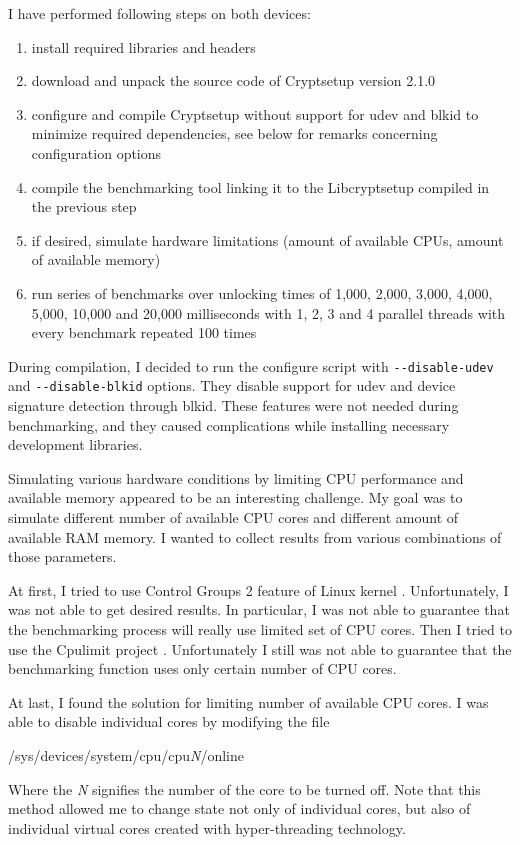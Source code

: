 \documentclass[nolof]{fithesis3}
\begin{document}
I have performed following steps on both devices:

\begin{enumerate}
\item install required libraries and headers

\item download and unpack the source code of Cryptsetup version 2.1.0

\item configure and compile Cryptsetup without support for udev and blkid to minimize required dependencies, see below for remarks concerning configuration options

\item compile the benchmarking tool linking it to the Libcryptsetup compiled in the previous step

\item if desired, simulate hardware limitations (amount of available CPUs, amount of available memory)

\item run series of benchmarks over unlocking times of 1,000, 2,000, 3,000, 4,000, 5,000, 10,000 and 20,000 milliseconds with 1, 2, 3 and 4 parallel threads with every benchmark repeated 100 times
\end{enumerate}

During compilation, I decided to run the configure script with \verb+--disable-udev+ and \verb+--disable-blkid+ options. They disable support for udev and device signature detection through blkid. These features were not needed during benchmarking, and they caused complications while installing necessary development libraries.

Simulating various hardware conditions by limiting CPU performance and available memory appeared to be an interesting challenge. My goal was to simulate different number of available CPU cores and different amount of available RAM memory. I wanted to collect results from various combinations of those parameters.

At first, I tried to use Control Groups 2 feature of Linux kernel \parencite{cgroups2}. Unfortunately, I was not able to get desired results. In particular, I was not able to guarantee that the benchmarking process will really use limited set of CPU cores. Then I tried to use the Cpulimit project \parencite{cpulimit}. Unfortunately I still was not able to guarantee that the benchmarking function uses only certain number of CPU cores.

At last, I found the solution for limiting number of available CPU cores. I was able to disable individual cores by modifying the file 
\begin{tt}
/sys/devices/system/cpu/cpu\emph{N}/online
\end{tt}
 Where the \emph{N} signifies the number of the core to be turned off. Note that this method allowed me to change state not only of individual cores, but also of individual virtual cores created with hyper-threading technology.
\end{document}
